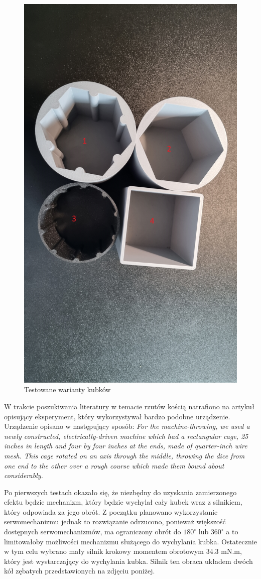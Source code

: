 \begin{figure}[H]
    \centering
    \includegraphics[width=0.65\linewidth, trim={35mm 380mm 20mm 240mm}, clip]{chapters/03-praca-wlasna/figures/kubki.jpg}
    \caption{\label{fig:kubki}Testowane warianty kubków}
\end{figure}

W trakcie poszukiwania literatury w temacie rzutów kością natrafiono na artykuł opisujący eksperyment, który wykorzystywał bardzo podobne urządzenie.
Urządzenie opisano w następujący sposób: \textit{For the machine-throwing, we used a newly constructed, electrically-driven machine which had a rectangular 
cage, 25 inches in length and four by four inches at the ends, made of quarter-inch wire mesh. This cage rotated on an axis through the middle, throwing the dice
from one end to the other over a rough course which made them bound about considerably.}\cite{PK}

Po pierwszych testach okazało się, że niezbędny do uzyskania zamierzonego efektu będzie mechanizm, który będzie 
wychylał cały kubek wraz z silnikiem, który odpowiada za jego obrót. Z początku planowano wykorzystanie
serwomechanizmu jednak to rozwiązanie odrzucono, ponieważ większość dostępnych serwomechanizmów, ma
ograniczony obrót do $180^{\circ}$ lub $360^{\circ}$ a to limitowałoby możliwości mechanizmu służącego do wychylania kubka.
Ostatecznie w tym celu wybrano mały silnik krokowy momentem obrotowym 34.3 mN.m, który jest wystarczający do wychylania kubka. 
Silnik ten obraca układem dwóch kół zębatych przedstawionych na zdjęciu poniżej.

